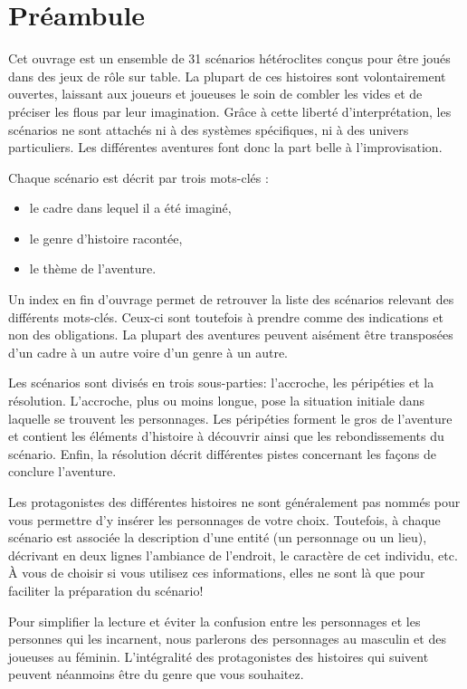 \documentclass[a5paper,pagesize,10pt,bibliography=totoc,numbers=enddot,
headings=normal,DIV=9,twoside=false,tablecaptionabove]{scrbook}
\begin{document}
\newpage


\chapter*{Préambule}

Cet ouvrage est un ensemble de 31 scénarios hétéroclites conçus pour être joués dans des jeux de rôle sur table.
La plupart de ces histoires sont volontairement ouvertes, laissant aux joueurs et joueuses le soin de combler les vides et de préciser les flous par leur imagination.
Grâce à cette liberté d'interprétation, les scénarios ne sont attachés ni à des systèmes spécifiques, ni à des univers particuliers.
Les différentes aventures font donc la part belle à l'improvisation.

Chaque scénario est décrit par trois mots-clés :
\begin{itemize}
	\item le cadre dans lequel il a été imaginé,
	\item le genre d'histoire racontée,
	\item le thème de l'aventure.
\end{itemize}

Un index en fin d'ouvrage permet de retrouver la liste des scénarios relevant des différents mots-clés.
Ceux-ci sont toutefois à prendre comme des indications et non des obligations.
La plupart des aventures peuvent aisément être transposées d'un cadre à un autre voire d'un genre à un autre.

Les scénarios sont divisés en trois sous-parties: l'accroche, les péripéties et la résolution.
L'accroche, plus ou moins longue, pose la situation initiale dans laquelle se trouvent les personnages.
Les péripéties forment le gros de l'aventure et contient les éléments d'histoire à découvrir ainsi que les rebondissements du scénario.
Enfin, la résolution décrit différentes pistes concernant les façons de conclure l'aventure.

Les protagonistes des différentes histoires ne sont généralement pas nommés pour vous permettre d'y insérer les personnages de votre choix.
Toutefois, à chaque scénario est associée la description d'une entité (un personnage ou un lieu), décrivant en deux lignes l'ambiance de l'endroit, le caractère de cet individu, etc.
À vous de choisir si vous utilisez ces informations, elles ne sont là que pour faciliter la préparation du scénario!

Pour simplifier la lecture et éviter la confusion entre les personnages et les personnes qui les incarnent, nous parlerons des personnages au masculin et des joueuses au féminin.
L'intégralité des protagonistes des histoires qui suivent peuvent néanmoins être du genre que vous souhaitez.
\end{document}
